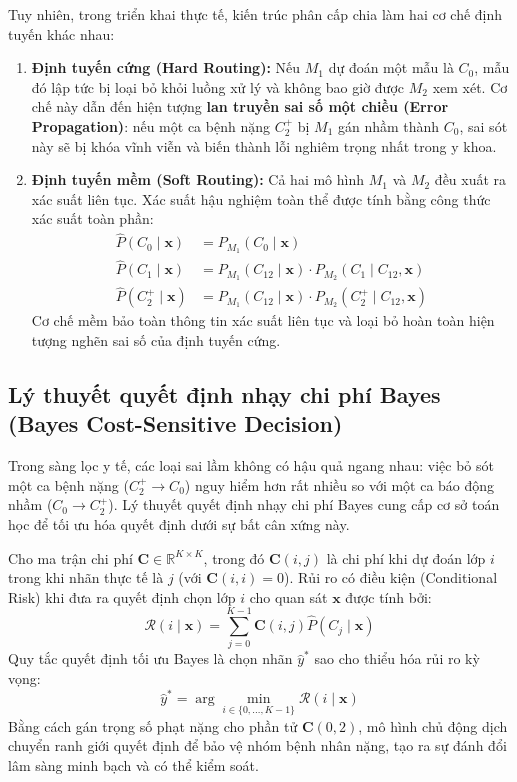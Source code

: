 Tuy nhiên, trong triển khai thực tế, kiến trúc phân cấp chia làm hai cơ chế định tuyến khác nhau:
\begin{enumerate}
    \item \textbf{Định tuyến cứng (Hard Routing):} Nếu $M_1$ dự đoán một mẫu là $C_0$, mẫu đó lập tức bị loại bỏ khỏi luồng xử lý và không bao giờ được $M_2$ xem xét. Cơ chế này dẫn đến hiện tượng \textbf{lan truyền sai số một chiều (Error Propagation)}: nếu một ca bệnh nặng $C_2^+$ bị $M_1$ gán nhầm thành $C_0$, sai sót này sẽ bị khóa vĩnh viễn và biến thành lỗi nghiêm trọng nhất trong y khoa.
    \item \textbf{Định tuyến mềm (Soft Routing):} Cả hai mô hình $M_1$ và $M_2$ đều xuất ra xác suất liên tục. Xác suất hậu nghiệm toàn thể được tính bằng công thức xác suất toàn phần:
    \begin{align}
        \hat{P}(C_0 \mid \mathbf{x}) &= P_{M_1}(C_0 \mid \mathbf{x}) \\
        \hat{P}(C_1 \mid \mathbf{x}) &= P_{M_1}(C_{12} \mid \mathbf{x}) \cdot P_{M_2}(C_1 \mid C_{12}, \mathbf{x}) \\
        \hat{P}(C_2^+ \mid \mathbf{x}) &= P_{M_1}(C_{12} \mid \mathbf{x}) \cdot P_{M_2}(C_2^+ \mid C_{12}, \mathbf{x})
    \end{align}
    Cơ chế mềm bảo toàn thông tin xác suất liên tục và loại bỏ hoàn toàn hiện tượng nghẽn sai số của định tuyến cứng.
\end{enumerate}

\subsection{Lý thuyết quyết định nhạy chi phí Bayes (Bayes Cost-Sensitive Decision)}
\label{subsec:cost-sensitive-paradigm}

Trong sàng lọc y tế, các loại sai lầm không có hậu quả ngang nhau: việc bỏ sót một ca bệnh nặng ($C_2^+ \to C_0$) nguy hiểm hơn rất nhiều so với một ca báo động nhầm ($C_0 \to C_2^+$). Lý thuyết quyết định nhạy chi phí Bayes \cite{elkan2001foundations} cung cấp cơ sở toán học để tối ưu hóa quyết định dưới sự bất cân xứng này.

Cho ma trận chi phí $\mathbf{C} \in \mathbb{R}^{K \times K}$, trong đó $\mathbf{C}(i, j)$ là chi phí khi dự đoán lớp $i$ trong khi nhãn thực tế là $j$ (với $\mathbf{C}(i, i) = 0$). Rủi ro có điều kiện (Conditional Risk) khi đưa ra quyết định chọn lớp $i$ cho quan sát $\mathbf{x}$ được tính bởi:
\begin{equation}
    \mathcal{R}(i \mid \mathbf{x}) = \sum_{j=0}^{K-1} \mathbf{C}(i, j) \hat{P}(C_j \mid \mathbf{x})
\end{equation}
Quy tắc quyết định tối ưu Bayes là chọn nhãn $\hat{y}^*$ sao cho thiểu hóa rủi ro kỳ vọng:
\begin{equation}
    \hat{y}^* = \arg\min_{i \in \{0, \dots, K-1\}} \mathcal{R}(i \mid \mathbf{x})
\end{equation}
Bằng cách gán trọng số phạt nặng cho phần tử $\mathbf{C}(0, 2)$, mô hình chủ động dịch chuyển ranh giới quyết định để bảo vệ nhóm bệnh nhân nặng, tạo ra sự đánh đổi lâm sàng minh bạch và có thể kiểm soát.


